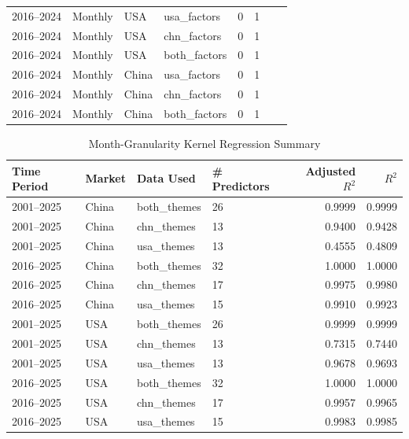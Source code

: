 \begin{table}[htbp]
\begin{tabular}{@{}lllllrrr@{}}
2016--2024  & Monthly     & USA           & usa\_factors   & 0         & 1  \\
2016--2024  & Monthly     & USA           & chn\_factors   & 0         & 1  \\
2016--2024  & Monthly     & USA           & both\_factors  & 0         & 1  \\
2016--2024  & Monthly     & China         & usa\_factors   & 0         & 1  \\
2016--2024  & Monthly     & China         & chn\_factors   & 0         & 1  \\
2016--2024  & Monthly     & China         & both\_factors  & 0         & 1  \\ \bottomrule
\end{tabular}
\end{table}

\begin{table}[htbp]
\centering
\caption{Month-Granularity Kernel Regression Summary}
\label{tab:kernel_overfit}
\begin{tabular}{@{}llllrr@{}}
\toprule
Time Period & Market & Data Used  & \# Predictors   & Adjusted $R^2$ & $R^2$ \\ \midrule
2001--2025 & China         & both\_themes  &  26 & 0.9999         & 0.9999 \\
2001--2025  & China         & chn\_themes  & 13  & 0.9400         & 0.9428 \\
2001--2025  & China         & usa\_themes   & 13 & 0.4555         & 0.4809 \\
2016--2025  & China         & both\_themes  & 32  & 1.0000         & 1.0000 \\
2016--2025  &  China         & chn\_themes   & 17 & 0.9975         & 0.9980 \\
2016--2025    & China         & usa\_themes  &  15 & 0.9910         & 0.9923 \\
2001--2025      & USA           & both\_themes  & 26 & 0.9999         & 0.9999 \\
2001--2025     & USA           & chn\_themes  & 13  & 0.7315         & 0.7440 \\
2001--2025     & USA           & usa\_themes  & 13  & 0.9678         & 0.9693 \\
2016--2025    & USA           & both\_themes  & 32 & 1.0000         & 1.0000 \\
2016--2025     & USA           & chn\_themes  & 17  & 0.9957         & 0.9965 \\
2016--2025     & USA           & usa\_themes  &  15 & 0.9983         & 0.9985 \\ \bottomrule
\end{tabular}
\end{table}